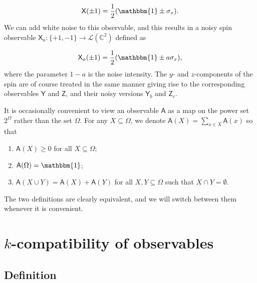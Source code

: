 \documentclass[12pt]{amsart}
\theoremstyle{definition}
\newcommand{\complex}{\mathbb C} %
\newcommand{\id}{\mathbbm{1}} %
\newcommand{\A}{\mathsf{A}}%
\begin{document}
$$
\mathsf{X}(\pm 1) = \frac{1}{2} (\id \pm \sigma_x).
$$
We can  add white noise to this observable, and this results in a noisy spin observable $\mathsf{X}_a:\{+1,-1\}\to \mathcal{L}(\complex^2)$ defined as

$$
\mathsf{X}_a(\pm 1) = \frac{1}{2} (\id \pm a\sigma_x),
$$
where the parameter $1-a$ is the noise intensity.
The $y$- and $z$-components of the spin are of course treated in the same manner giving rise to the corresponding observables $\mathsf{Y}$ and $\mathsf{Z}$, and their noisy versions \(\mathsf{Y}_b\) and \(\mathsf{Z}_c\).

It is occasionally convenient to view an observable $\A$ as a map on the power set $2^\Omega$ rather than the set $\Omega$.  For any $X\subseteq\Omega$, we denote $\A(X)=\sum_{x\in X} \A(x)$ so that 
\begin{enumerate}[leftmargin=*,labelsep=3mm,label=(\roman*')]
\item $\A(X) \geq 0$ for all $X\subseteq\Omega$;
\item $\A(\Omega) = \id$;
\item $\A(X\cup Y) = \A(X) + \A(Y)$ for all $X,Y\subseteq\Omega$ such that $X\cap Y = \emptyset$.
\end{enumerate}
The two definitions are clearly equivalent, and we will switch between them whenever it is convenient.



\section{$k$-compatibility of observables}\label{sec:k-comp}
\label{sec:k-compatibility}

\subsection{Definition}
\end{document}
